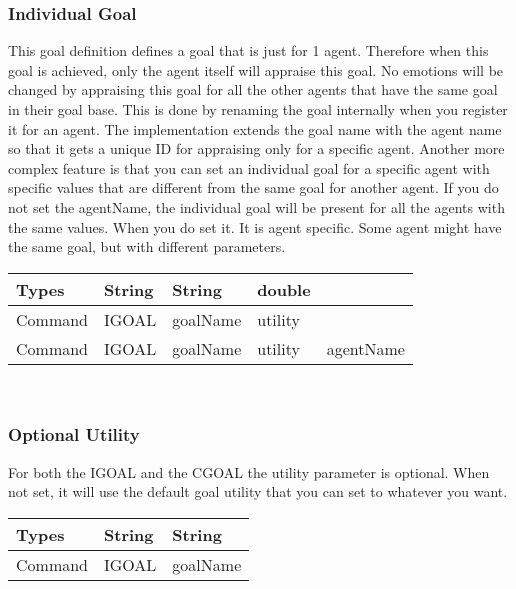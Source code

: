 \documentclass{scrartcl}
\begin{document}
\subsubsection{Individual Goal}
This goal definition defines a goal that is just for 1 agent. Therefore when this goal is achieved, only the agent itself will appraise this goal. No emotions will be changed by appraising this goal for all the other agents that have the same goal in their goal base. This is done by renaming the goal internally when you register it for an agent. The implementation extends the goal name with the agent name so that it gets a unique ID for appraising only for a specific agent. Another more complex feature is that you can set an individual goal for a specific agent with specific values that are different from the same goal for another agent. If you do not set the agentName, the individual goal will be present for all the agents with the same values. When you do set it. It is agent specific. Some agent might have the same goal, but with different parameters.\\
\begin{tabular}{|l|l|l|l|l|}
\hline  Types & String & String & double & \\ 
\hline  Command & IGOAL & goalName & utility &\\
\hline  Command & IGOAL & goalName & utility & agentName\\ 
\hline 
\end{tabular}
\\

\subsubsection{Optional Utility}
For both the IGOAL and the CGOAL the utility parameter is optional. When not set, it will use the default goal utility that you can set to whatever you want.\\
\begin{tabular}{|l|l|l|}
	\hline  Types& String & String  \\ 
	\hline  Command & IGOAL & goalName \\ 
	\hline 
\end{tabular}
\\
\end{document}
